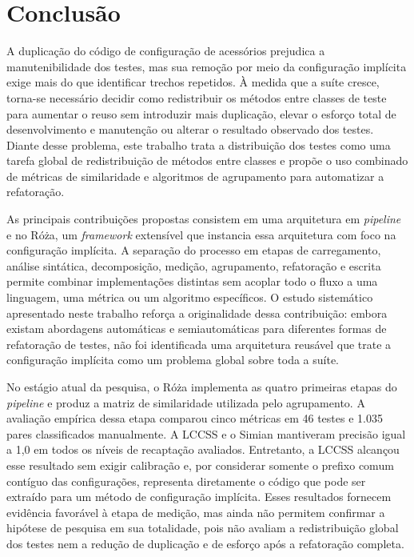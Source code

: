\chapter{Conclusão}
\label{chapter:conclusion}

A duplicação do código de configuração de acessórios prejudica a manutenibilidade dos testes, mas sua remoção por meio da configuração implícita exige mais do que identificar trechos repetidos. À medida que a suíte cresce, torna-se necessário decidir como redistribuir os métodos entre classes de teste para aumentar o reuso sem introduzir mais duplicação, elevar o esforço total de desenvolvimento e manutenção ou alterar o resultado observado dos testes. Diante desse problema, este trabalho trata a distribuição dos testes como uma tarefa global de redistribuição de métodos entre classes e propõe o uso combinado de métricas de similaridade e algoritmos de agrupamento para automatizar a refatoração.

As principais contribuições propostas consistem em uma arquitetura em \textit{pipeline} e no Róża, um \textit{framework} extensível que instancia essa arquitetura com foco na configuração implícita. A separação do processo em etapas de carregamento, análise sintática, decomposição, medição, agrupamento, refatoração e escrita permite combinar implementações distintas sem acoplar todo o fluxo a uma linguagem, uma métrica ou um algoritmo específicos. O estudo sistemático apresentado neste trabalho reforça a originalidade dessa contribuição: embora existam abordagens automáticas e semiautomáticas para diferentes formas de refatoração de testes, não foi identificada uma arquitetura reusável que trate a configuração implícita como um problema global sobre toda a suíte.

No estágio atual da pesquisa, o Róża implementa as quatro primeiras etapas do \textit{pipeline} e produz a matriz de similaridade utilizada pelo agrupamento. A avaliação empírica dessa etapa comparou cinco métricas em 46 testes e 1.035 pares classificados manualmente. A LCCSS e o Simian mantiveram precisão igual a 1,0 em todos os níveis de recaptação avaliados. Entretanto, a LCCSS alcançou esse resultado sem exigir calibração e, por considerar somente o prefixo comum contíguo das configurações, representa diretamente o código que pode ser extraído para um método de configuração implícita. Esses resultados fornecem evidência favorável à etapa de medição, mas ainda não permitem confirmar a hipótese de pesquisa em sua totalidade, pois não avaliam a redistribuição global dos testes nem a redução de duplicação e de esforço após a refatoração completa.

